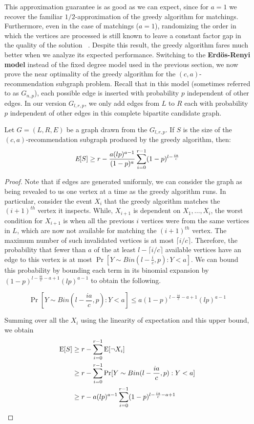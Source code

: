 This approximation guarantee is as good as we can expect,
since for $a=1$ we recover the familiar $1/2$-approximation
of the greedy algorithm for matchings. Furthermore, even in the case of matchings ($a=1$),
randomizing the order in which the vertices are processed is still
known to leave a constant factor gap in the quality of the solution
~\cite{KarpVaziraniVazirani1990}. Despite this result, the greedy
algorithm fares much better when we analyze its expected performance.
Switching to the
{\bf Erd\"{o}s-Renyi model} instead of the fixed degree model used in
the previous section, we now prove the near optimality of the
greedy algorithm for the $(c, a)$-recommendation subgraph problem. 
Recall that in this model (sometimes referred to as $G_{n,p}$), each possible edge is inserted with probability $p$ independent of other edges. In our version $G_{l,r,p}$, we only add edges from $L$ to $R$ each with probability $p$ independent of other edges in this complete bipartite candidate graph.

\begin{thm}
Let $G=(L,R,E)$ be a graph drawn from the $G_{l,r,p}$. If $S$ is the size of the $(c,a)$-recommendation subgraph produced by the greedy algorithm, then:
\[ \emph{\text{E}}[S] \geq r - \frac{a(lp)^{a-1}}{(1-p)^a} \sum_{i=0}^{r-1}(1-p)^{l-\frac{ia}{c}}\]
\end{thm}
\begin{proof}
Note that if edges are generated uniformly, we can consider the
graph as being revealed to us one vertex at a time as the greedy
algorithm runs. In particular, consider the event $X_i$ that the
greedy algorithm matches the $(i+1)^{th}$ vertex it inspects. While,
$X_{i+1}$ is dependent on $X_1,\ldots, X_i$, the worst condition for
$X_{i+1}$ is when all the previous $i$ vertices were from the same
vertices in $L$, which are now not available for matching the
$(i+1)^{th}$ vertex. The maximum number of such invalidated vertices
is at most $\lceil i/c \rceil$. Therefore, the probability that fewer
than $a$ of the at least $l-\lceil i/c \rceil $ available
vertices have an edge to this vertex is at most $\Pr[Y\sim Bin(l-\frac{i}{c},p): Y < a]$.
We can bound this probability by bounding each term in its binomial
expansion by $(1-p)^{l-\frac{ia}{c}-a+1}(lp)^{a-1}$ to obtain the following.

\[ \Pr[Y\sim Bin(l-\frac{ia}{c},p): Y < a] \leq a (1-p)^{l-\frac{ia}{c}-a+1}(lp)^{a-1}\]

Summing over all the $X_i$ using the linearity of expectation and this upper bound,
we obtain
\begin{align*}
      \text{E}[S]
&\geq r - \sum_{i=0}^{r-1} \text{E}[\lnot X_i] \\
&\geq r - \sum_{i=0}^{r-1} \Pr[Y \sim Bin(l-\frac{ia}{c},p): Y < a] \\
&\geq r - a(lp)^{a-1}\sum_{i=0}^{r-1}(1-p)^{l-\frac{ia}{c}-a+1}
\end{align*}
\end{proof}

